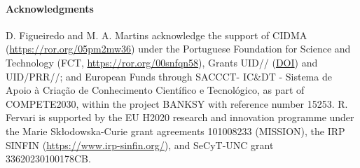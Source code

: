 \documentclass[preprint]{elsarticle}
\theoremstyle{definition}
\theoremstyle{remark}
\begin{document}







\paragraph{Acknowledgments}
D. Figueiredo and M. A. Martins acknowledge the support of CIDMA (\url{https://ror.org/05pm2mw36})
under the Portuguese Foundation for Science and Technology 
(FCT, \url{https://ror.org/00snfqn58}), Grants UID// (\href{https://doi.org/10.54499/UID/04106/2025}{DOI}) 
and UID/\allowbreak PRR//; and European Funds through SACCCT- IC\&DT - Sistema de Apoio \`a Cria\c c\~ao de Conhecimento Cient\'ifico e Tecnol\'ogico, as part of COMPETE2030, within the project BANKSY with reference number 15253.
R. Fervari is supported by 
%
the EU H2020 research and innovation programme
under the Marie Sk{\l}odowska-Curie grant agreements 101008233
({MISSION}),
%
the IRP SINFIN (\url{https://www.irp-sinfin.org/}), 
%
and SeCyT-UNC grant 33620230100178CB.



\end{document}
